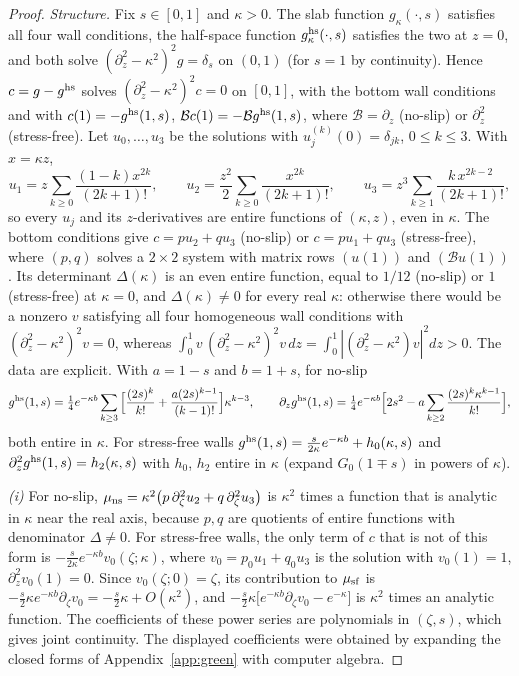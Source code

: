 \begin{proof}
\emph{Structure.} Fix $s\in[0,1]$ and $\kappa>0$. The slab function $g_\kappa(\cdot,s)$ satisfies all four wall
conditions, the half-space function $g^{\rm hs}_\kappa(\cdot,s)$ satisfies the two at $z=0$, and both solve
$(\partial_z^2-\kappa^2)^2g=\delta_s$ on $(0,1)$ (for $s=1$ by continuity). Hence $c=g-g^{\rm hs}$ solves
$(\partial_z^2-\kappa^2)^2c=0$ on $[0,1]$, with the bottom wall conditions and with $c(1)=-g^{\rm hs}(1,s)$,
$\mathcal Bc(1)=-\mathcal Bg^{\rm hs}(1,s)$, where $\mathcal B=\partial_z$ (no-slip) or $\partial_z^2$
(stress-free). Let $u_0,\dots,u_3$ be the solutions with $u_j^{(k)}(0)=\delta_{jk}$, $0\le k\le3$. With $x=\kappa z$,
\[
u_1=z\sum_{k\ge0}\frac{(1-k)x^{2k}}{(2k+1)!},\qquad u_2=\frac{z^2}2\sum_{k\ge0}\frac{x^{2k}}{(2k+1)!},\qquad
u_3=z^3\sum_{k\ge1}\frac{k\,x^{2k-2}}{(2k+1)!},
\]
so every $u_j$ and its $z$-derivatives are entire functions of $(\kappa,z)$, even in $\kappa$. The bottom
conditions give $c=pu_2+qu_3$ (no-slip) or $c=pu_1+qu_3$ (stress-free), where $(p,q)$ solves a $2\times2$ system
with matrix rows $(u(1))$ and $(\mathcal Bu(1))$. Its determinant $\Delta(\kappa)$ is an even entire function, equal to
$1/12$ (no-slip) or $1$ (stress-free) at $\kappa=0$, and $\Delta(\kappa)\ne0$ for every real $\kappa$: otherwise there
would be a nonzero $v$ satisfying all four homogeneous wall conditions with $(\partial_z^2-\kappa^2)^2v=0$, whereas
$\int_0^1v\,(\partial_z^2-\kappa^2)^2v\,dz=\int_0^1|(\partial_z^2-\kappa^2)v|^2dz>0$. The data are explicit. With
$a=1-s$ and $b=1+s$, for no-slip
\[
g^{\rm hs}(1,s)=\tfrac14e^{-\kappa b}\sum_{k\ge3}\Big[\frac{(2s)^k}{k!}+\frac{a(2s)^{k-1}}{(k-1)!}\Big]\kappa^{k-3},\qquad
\partial_zg^{\rm hs}(1,s)=\tfrac14e^{-\kappa b}\Big[2s^2-a\sum_{k\ge2}\frac{(2s)^k\kappa^{k-1}}{k!}\Big],
\]
both entire in $\kappa$. For stress-free walls $g^{\rm hs}(1,s)=\frac{s}{2\kappa}e^{-\kappa b}+h_0(\kappa,s)$ and
$\partial_z^2g^{\rm hs}(1,s)=h_2(\kappa,s)$ with $h_0$, $h_2$ entire in $\kappa$ (expand $G_0(1\mp s)$ in powers of
$\kappa$).

\emph{(i)} For no-slip, $\mu_{\rm ns}=\kappa^2\big(p\,\partial_\zeta^2u_2+q\,\partial_\zeta^2u_3\big)$ is $\kappa^2$ times
a function that is analytic in $\kappa$ near the real axis, because $p,q$ are quotients of entire functions with
denominator $\Delta\ne0$. For stress-free walls, the only term of $c$ that is not of this form is
$-\frac{s}{2\kappa}e^{-\kappa b}v_0(\zeta;\kappa)$, where $v_0=p_0u_1+q_0u_3$ is the solution with $v_0(1)=1$,
$\partial_z^2v_0(1)=0$. Since $v_0(\zeta;0)=\zeta$, its contribution to $\mu_{\rm sf}$ is
$-\frac s2\kappa e^{-\kappa b}\partial_\zeta v_0=-\frac s2\kappa+O(\kappa^2)$, and
$-\frac s2\kappa\big[e^{-\kappa b}\partial_\zeta v_0-e^{-\kappa}\big]$ is $\kappa^2$ times an analytic function. The
coefficients of these power series are polynomials in $(\zeta,s)$, which gives joint continuity. The displayed
coefficients were obtained by expanding the closed forms of Appendix~\ref{app:green} with computer algebra.


\end{proof}
